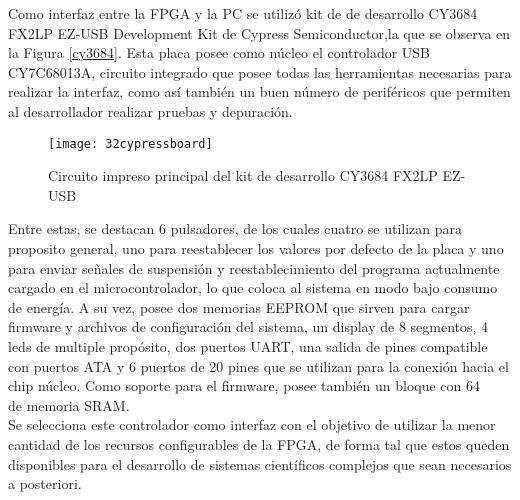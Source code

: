 	
	 
	
	Como interfaz entre la FPGA y la PC se utilizó kit de de desarrollo CY3684 FX2LP EZ-USB Development Kit de Cypress Semiconductor,la que se observa en la Figura \ref{cy3684}. Esta placa posee como núcleo el controlador USB CY7C68013A, circuito integrado que posee todas las herramientas necesarias para realizar la interfaz, como así también un buen número de periféricos que permiten al desarrollador realizar pruebas y depuración.\\
	
	\begin{figure}
		\centering
		\texttt{[image: 32cypressboard]}
		\caption{Circuito impreso principal del kit de desarrollo CY3684 FX2LP EZ-USB}
		\label{fig:cy3684}
	\end{figure}
	
	Entre estas, se destacan 6 pulsadores, de los cuales cuatro se utilizan para proposito general, uno para reestablecer los valores por defecto de la placa y uno para enviar señales de suspensión y reestablecimiento del programa actualmente cargado en el microcontrolador, lo que coloca al sistema en modo bajo consumo de energía. A su vez, posee dos memorias EEPROM que sirven para cargar firmware y archivos de configuración del sistema, un display de 8 segmentos, 4 leds de multiple propósito, dos puertos UART, una salida de pines compatible con puertos ATA y 6 puertos de 20 pines que se utilizan para la conexión hacia el chip núcleo. Como soporte para el firmware, posee también un bloque con \SI{64}{\kilo\byte} de memoria SRAM.\\
	
	Se selecciona este controlador como interfaz con el objetivo de utilizar la menor cantidad de los recursos configurables de la FPGA, de forma tal que estos queden disponibles para el desarrollo de sistemas científicos complejos que sean necesarios a posteriori.\\
	